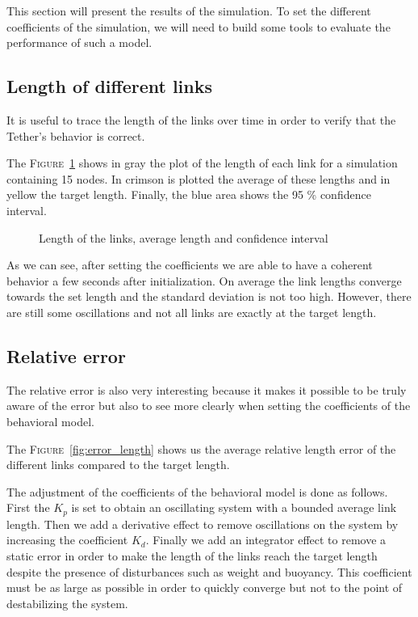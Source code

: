 This section will present the results of the simulation. To set the different coefficients of the simulation, we will need to build some tools to evaluate the performance of such a model.
\subsection{Length of different links}

It is useful to trace the length of the links over time in order to verify that the Tether's behavior is correct.

The \textsc{Figure}~\ref{fig:length} shows in gray the plot of the length of each link for a simulation containing 15 nodes. In crimson is plotted the average of these lengths and in yellow the target length. Finally, the blue area shows the 95 \% confidence interval.

\begin{figure}[!htb]
    \centering
    
    \caption{Length of the links, average length and confidence interval}
    \label{fig:length}
\end{figure}

As we can see, after setting the coefficients we are able to have a coherent behavior a few seconds after initialization. On average the link lengths converge towards the set length and the standard deviation is not too high. However, there are still some oscillations and not all links are exactly at the target length.

\subsection{Relative error}
The relative error is also very interesting because it makes it possible to be truly aware of the error but also to see more clearly when setting the coefficients of the behavioral model.

The \textsc{Figure}~\ref{fig:error_length} shows us the average relative length error of the different links compared to the target length.

The adjustment of the coefficients of the behavioral model is done as follows. First the $K_p$ is set to obtain an oscillating system with a bounded average link length. Then we add a derivative effect to remove oscillations on the system by increasing the coefficient $K_d$. Finally we add an integrator effect to remove a static error in order to make the length of the links reach the target length despite the presence of disturbances such as weight and buoyancy. This coefficient must be as large as possible in order to quickly converge but not to the point of destabilizing the system.

